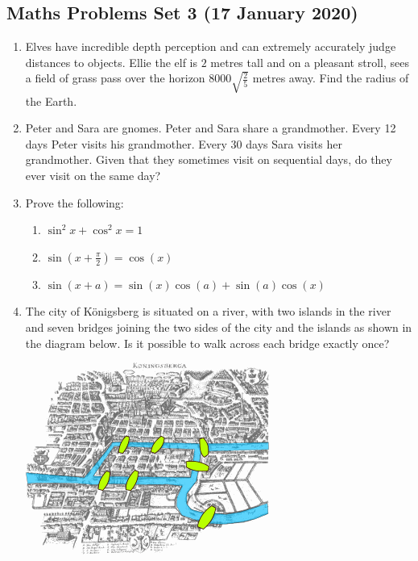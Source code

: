 \documentclass{article}
\begin{document}
\begin{center}
        \section*{Maths Problems Set 3 (17 January 2020)}
\end{center}

\begin{enumerate}
    \item
    Elves have incredible depth perception and can extremely accurately judge distances to objects. Ellie the elf is $2$ metres tall and on a pleasant stroll, sees a field of grass pass over the horizon $8000 \sqrt{\frac{2}{5}}$ metres away. Find the radius of the Earth.

    \item
    Peter and Sara are gnomes. Peter and Sara share a grandmother. Every 12 days Peter visits his grandmother. Every 30 days Sara visits her grandmother. Given that they sometimes visit on sequential days, do they ever visit on the same day?
    
    \item
    Prove the following:
    \begin{enumerate}
        \item $\sin^2 x + \cos^2 x = 1$
        \item $\sin(x + \frac{\pi}{2}) = \cos(x)$
        \item $\sin(x + a) = \sin (x) \cos (a) + \sin (a) \cos (x)$
    \end{enumerate}
    
    \item
    The city of Königsberg is situated on a river, with two islands in the river and seven bridges joining the two sides of the city and the islands as shown in the diagram below. Is it possible to walk across each bridge exactly once?
    
    \includegraphics[scale=0.5]{konigsberg_bridges.png}
    

\end{enumerate}
\end{document}
